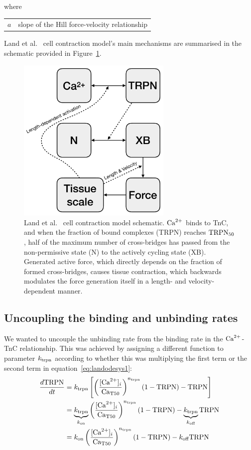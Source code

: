 \noindent
where

\vspace{0.2cm}
\begin{tabular}{ll}
    $a$ & slope of the Hill force-velocity relationship
\end{tabular}

\vspace{0.2cm}\noindent
Land et al.~\cite{Land:2012} cell contraction model's main mechanisms are summarised in the schematic provided in Figure~\ref{fig:cellcontrschematic}.

\begin{figure}[ht!]
    \myfloatalign
    \includegraphics[width=0.66\textwidth]{figures/chapter02/cellular_contraction_land.pdf}
    \caption{Land et al.~\cite{Land:2012} cell contraction model schematic. $\textrm{Ca}^{2+}$ binds to TnC, and when the fraction of bound complexes (TRPN) reaches $\textrm{TRPN}_{50}$, half of the maximum number of cross-bridges has passed from the non-permissive state (N) to the actively cycling state (XB). Generated active force, which directly depends on the fraction of formed cross-bridges, causes tissue contraction, which backwards modulates the force generation itself in a length- and velocity-dependent manner.}
    \label{fig:cellcontrschematic}
\end{figure}


%
%
%
\subsection{Uncoupling the binding and unbinding rates}\label{sec:ch2uncoupling_binding_and_unbinding_rates}
We wanted to uncouple the unbinding rate from the binding rate in the $\textrm{Ca}^{2+}$-TnC relationship. This was achieved by assigning a different function to parameter $k_{\textrm{trpn}}$ according to whether this was multiplying the first term or the second term in equation~\eqref{eq:landodesys1}:
%
\begin{align}
    \frac{d\text{TRPN}}{dt} &=k_{\textrm{trpn}}\left[\left(\frac{[\textrm{Ca}^{2+}]_{i}}{\textrm{Ca}_{\textrm{T}50}}\right)^{n_{\textrm{trpn}}}(1-\textrm{TRPN})-\textrm{TRPN}\right] \\
    &= \underbrace{k_{\textrm{trpn}}}_{k_{\textrm{on}}}\left(\frac{[\textrm{Ca}^{2+}]_{i}}{\textrm{Ca}_{\textrm{T}50}}\right)^{n_{\textrm{trpn}}}(1-\textrm{TRPN})-\underbrace{k_{\textrm{trpn}}}_{k_{\textrm{off}}}\textrm{TRPN} \\
    &= k_{\textrm{on}}\left(\frac{[\textrm{Ca}^{2+}]_{i}}{\textrm{Ca}_{\textrm{T}50}}\right)^{n_{\textrm{trpn}}}(1-\textrm{TRPN})-k_{\textrm{off}}\textrm{TRPN} \label{eq:landodesys1mod}
\end{align}

